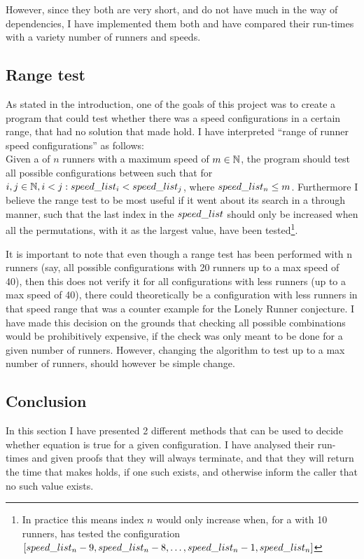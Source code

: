 However, since they both are very short, and do not have much in the way of dependencies, I have implemented them both and have compared their run-times with a variety number of runners and speeds.\\

\subsection{Range test}
As stated in the introduction, one of the goals of this project was to create a program that could test whether there was a speed configurations in a certain range, that had no solution that made  hold. I have interpreted ``range of runner speed configurations'' as follows:\\

Given a \comS of $n$ runners with a maximum speed of $m \in \mathbb{N}$, the program should test all possible configurations between such that for $i, j \in \mathbb{N}, i < j: speed\_list_i < speed\_list_j$, where $speed\_list_n \leq m$. Furthermore I believe the range test to be most useful if it went about its search in a through manner, such that the last index in the $speed\_list$ should only be increased when all the permutations, with it as the largest value, have been tested\footnote{In practice this means index $n$ would only increase when, for a \comS with 10 runners, has tested the configuration $[speed\_list_n - 9, speed\_list_n - 8, \ldots, speed\_list_n - 1, speed\_list_n]$}. 

It is important to note that even though a range test has been performed with n runners (say, all possible configurations with 20 runners up to a max speed of 40), then this does not verify it for all configurations with less runners (up to a max speed of 40), there could theoretically be a configuration with less runners in that speed range that was a counter example for the Lonely Runner conjecture. I have made this decision on the grounds that checking all possible combinations would be prohibitively expensive, if the check was only meant to be done for a given number of runners. However, changing the algorithm to test up to a max number of runners, should however be simple change. 


\subsection{Conclusion}
In this section I have presented 2 different methods that can be used to decide whether equation  is true for a given configuration. I have analysed their run-times and given proofs that they will always terminate, and that they will return the time that makes  holds, if one such exists, and otherwise inform the caller that no such value exists.
